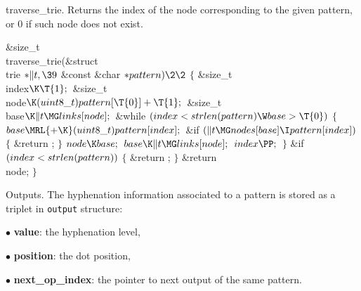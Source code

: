 traverse\_trie.
Returns the index of the node corresponding to the given pattern, or 0 if such
node does not exist.

\Y\B\1\1\&{size\_t} \\{traverse\_trie}(\&{struct} \\{trie} ${}{*}\|t,\39{}$%
\&{const} \&{char} ${}{*}\\{pattern})\2\2{}$\6
${}\{{}$\1\6
\&{size\_t} \\{index}${}\K\T{1};{}$\6
\&{size\_t} \\{node}${}\K(\\{uint8\_t})\\{pattern}[\T{0}]+\T{1};{}$\6
\&{size\_t} \\{base}${}\K\|t\MG\\{links}[\\{node}];{}$\7
\&{while} ${}(\\{index}<\\{strlen}(\\{pattern})\W\\{base}>\T{0}){}$\5
${}\{{}$\1\6
${}\\{base}\MRL{+{\K}}(\\{uint8\_t})\\{pattern}[\\{index}];{}$\6
\&{if} ${}(\|t\MG\\{nodes}[\\{base}]\I\\{pattern}[\\{index}]){}$\5
${}\{{}$\1\6
\&{return} ;\6
\4${}\}{}$\2\6
${}\\{node}\K\\{base};{}$\6
${}\\{base}\K\|t\MG\\{links}[\\{node}];{}$\6
${}\\{index}\PP;{}$\6
\4${}\}{}$\2\6
\&{if} ${}(\\{index}<\\{strlen}(\\{pattern})){}$\5
${}\{{}$\1\6
\&{return} ;\6
\4${}\}{}$\2\6
\&{return} \\{node};\6
\4${}\}{}$\2\par
\fi

Outputs.
The hyphenation information associated to a pattern is stored as a triplet in {%
\tt output} structure:

\item{$\bullet$} {\bf value}: the hyphenation level,
\item{$\bullet$} {\bf position}: the dot position,
\item{$\bullet$} {\bf next\_op\_index}: the pointer to next output of the same
pattern.

